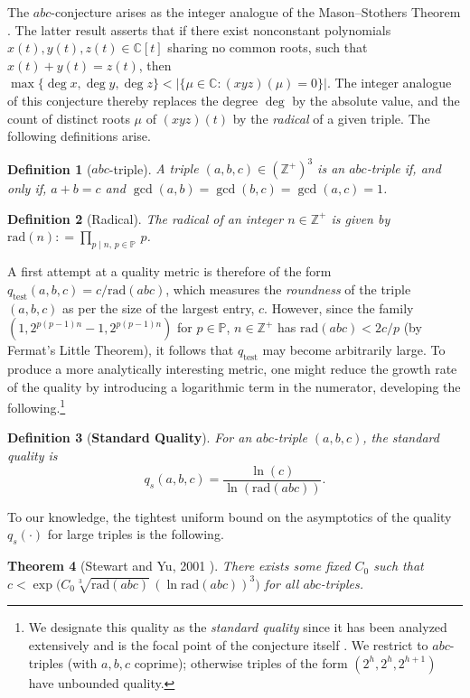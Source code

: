 \documentclass[11pt,letterpaper]{amsart}
\newtheorem{theorem}{Theorem}[section]
\newtheorem{definition}[theorem]{Definition}
\def\Z{\mathbb{Z}}
\def\Z{\mathbb{Z}}
\begin{document}
The $abc$-conjecture arises as the integer analogue of the Mason--Stothers Theorem \cite{mason1984,stothers1981}. The latter result asserts that if there exist nonconstant polynomials $x(t),y(t),z(t)\in\mathbb{C}[t]$ sharing no common roots, such that $x(t)+y(t)=z(t)$, then $\max\{\deg x,\deg y,\deg z\}<|\{\mu\in\mathbb{C}:(xyz)(\mu)=0\}|$. The integer analogue of this conjecture thereby replaces the degree $\deg$ by the absolute value, and the count of distinct roots $\mu$ of $(xyz)(t)$ by the \textit{radical} of a given triple. The following definitions arise.
\begin{definition}[$abc$-triple]\label{D_abc_triple}
A triple $(a,b,c) \in (\Z^{+})^3$ is an \emph{$abc$-triple} if, and only if, $a+b=c$ and $\gcd(a,b)=\gcd(b,c)=\gcd(a,c)=1$.
\end{definition}
\begin{definition}[Radical]\label{D_radical}
The \emph{radical} of an integer $n\in\Z^{+}$ is given by $\mathrm{rad}(n) : =\prod_{p\mid n,\,p\in\mathbb{P}} \, p$.
\end{definition}
A first attempt at a quality metric is therefore of the form $q_{\text{test}}(a,b,c)=c/\mathrm{rad}(abc)$, which measures the \textit{roundness} of the triple $(a, b, c)$ as per the size of the largest entry, $c$. However, since the family $(1,2^{p(p-1)n}-1,2^{p(p-1)n})$ for $p\in\mathbb{P}$, $n\in\Z^{+}$ has $\mathrm{rad}(abc)<2c/p$ (by Fermat's Little Theorem), it follows that $q_{\text{test}}$ may become arbitrarily large. To produce a more analytically interesting metric, one might reduce the growth rate of the quality by introducing a logarithmic term in the numerator, developing the following.\footnote{We designate this quality as the \textit{standard quality} since it has been analyzed extensively and is the focal point of the conjecture itself \cite{waldschmidt2015, desmit2022, horst2010, martin2016}. We restrict to $abc$-triples (with $a,b,c$ coprime); otherwise triples of the form $(2^h,2^h,2^{h+1})$ have unbounded quality.}
\begin{definition}[\textbf{Standard Quality}]\label{D_standard_quality}
For an $abc$-triple $(a, b, c)$, the standard quality is
\[
    q_s(a, b, c) = \frac{\ln(c)}{\ln(\mathrm{rad}(abc))}.
\]
\end{definition}

To our knowledge, the tightest uniform bound on the asymptotics of the quality $q_s(\cdot)$ for large triples is the following.
\begin{theorem}[Stewart and Yu, 2001 \cite{stewart2001}]\label{T_Stewart}
There exists some fixed $C_0$ such that
$
c < \exp\bigl(C_0\sqrt[3]{\mathrm{rad}(abc)}\,(\ln \mathrm{rad}(abc))^{3}\bigr)
$
for all $abc$-triples.
\end{theorem}
\end{document}
